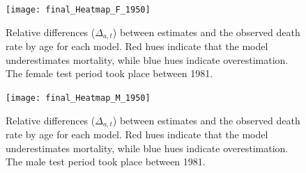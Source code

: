 \documentclass[a4,11pt]{article}
\begin{document}
\begin{figure}[H]
	\centering
	\texttt{[image: final\_Heatmap\_F\_1950]}\\
	 \caption{Relative differences ($\Delta_{a,t}$) between estimates and the observed death rate by age for each model. Red hues indicate that the model underestimates mortality, while blue hues indicate overestimation.
	 The female test period took place between 1981.}
	 \label{A:3}
\end{figure}


\begin{figure}[H]
	\centering
	\texttt{[image: final\_Heatmap\_M\_1950]}\\
	 \caption{Relative differences ($\Delta_{a,t}$) between estimates and the observed death rate by age for each model. Red hues indicate that the model underestimates mortality, while blue hues indicate overestimation.
	 The male test period took place between 1981.}
	 \label{A:4}
\end{figure}




\end{document}
